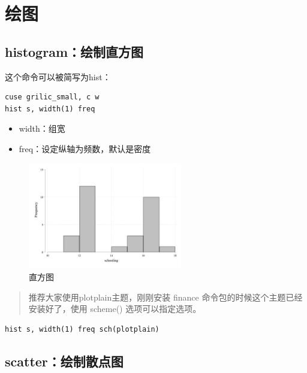 \documentclass[]{ctexbook}
\providecommand{\tightlist}{%
  \setlength{\itemsep}{0pt}\setlength{\parskip}{0pt}}
\begin{document}
\hypertarget{section-17}{%
\section{绘图}\label{section-17}}

\hypertarget{histogram}{%
\subsection{histogram：绘制直方图}\label{histogram}}

这个命令可以被简写为hist：

\begin{lstlisting}
cuse grilic_small, c w
hist s, width(1) freq
\end{lstlisting}

\begin{itemize}
\tightlist
\item
  width：组宽
\item
  freq：设定纵轴为频数，默认是密度
\end{itemize}

\begin{figure}

{\centering \includegraphics[width=0.6\textwidth]{assets/hist} 

}

\caption{直方图}\label{fig:hist}
\end{figure}

\begin{quote}
推荐大家使用plotplain主题，刚刚安装 finance 命令包的时候这个主题已经安装好了，使用 scheme() 选项可以指定选项。
\end{quote}

\begin{lstlisting}
hist s, width(1) freq sch(plotplain)
\end{lstlisting}

\hypertarget{scatter}{%
\subsection{scatter：绘制散点图}\label{scatter}}
\end{document}
